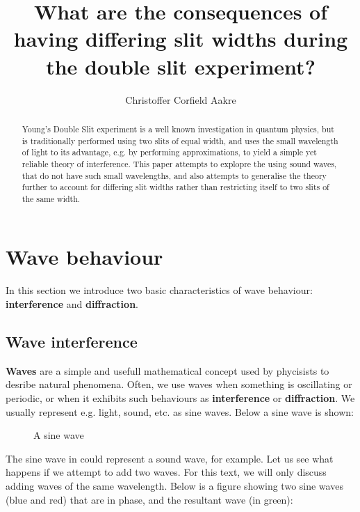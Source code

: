\documentclass{paper}
\title{What are the consequences of having differing slit widths during the double slit experiment?}
\author{Christoffer Corfield Aakre}
\begin{document}
 
\maketitle
\begin{abstract}
    Young's Double Slit experiment is a well known investigation
    in quantum physics, but is traditionally performed using two
    slits of equal width, and uses the small wavelength of light
    to its advantage, e.g. by performing approximations, to yield
    a simple yet reliable theory of interference. This paper 
    attempts to explopre the using sound waves,
    that do not have such small wavelengths, and also attempts to 
    generalise the theory further to account for differing slit widths
    rather than restricting itself to two slits of the same width.
\end{abstract}
\pagebreak
\tableofcontents
\pagebreak
\section{Wave behaviour}
In this section we introduce two basic characteristics of wave behaviour: \textbf{interference} and \textbf{diffraction}. 
\subsection{Wave interference}
\textbf{Waves} are a simple and usefull mathematical concept used by phycisists to desribe natural phenomena. Often, we use waves when something is oscillating or periodic, or when it exhibits such behaviours as \textbf{interference} or \textbf{diffraction}. We usually represent e.g. light, sound, etc. as sine waves. Below a sine wave is shown:

\begin{figure}[H]
\caption{A sine wave}
\label{fig:sine-wave}
\end{figure}

The sine wave in  could represent a sound wave, for example. Let us see what happens if we attempt to add two waves. For this text, we will only discuss adding waves of the same wavelength. Below is a figure showing two sine waves (blue and red) that are in phase, and the resultant wave (in green):
\end{document}
